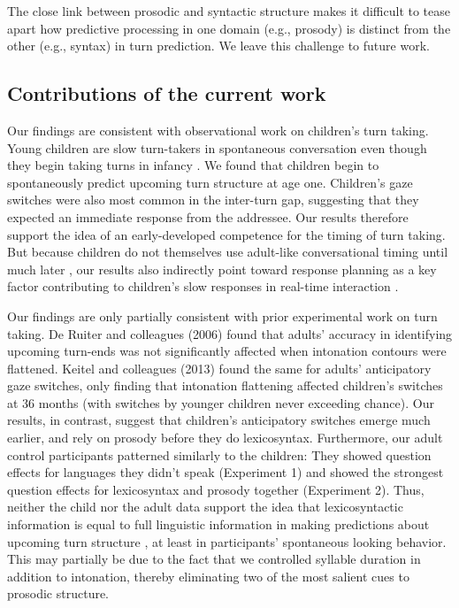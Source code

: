 \documentclass[authoryear, 12pt]{elsarticle}
\begin{document}
The close link between prosodic and syntactic structure makes it difficult to tease apart how predictive processing in one domain (e.g., prosody) is distinct from the other (e.g., syntax) in turn prediction. We leave this challenge to future work.

\subsection{Contributions of the current work}

Our findings are consistent with observational work on children's turn taking. Young children are slow turn-takers in spontaneous conversation \citep{casillas2015} even though they begin taking turns in infancy \citep{hilbrinkUR, jaffe2001}. We found that children begin to spontaneously predict upcoming turn structure at age one. Children's gaze switches were also most common in the inter-turn gap, suggesting that they expected an immediate response from the addressee. Our results therefore support the idea of an early-developed competence for the timing of turn taking. But because children do not themselves use adult-like conversational timing until much later \citep[age six; ][]{ervin-tripp1979}, our results also indirectly point toward response planning as a key factor contributing to children's slow responses in real-time interaction \citep{casillas2015}.

Our findings are only partially consistent with prior experimental work on turn taking. De Ruiter and colleagues (2006) found that adults' accuracy in identifying upcoming turn-ends was not significantly affected when intonation contours were flattened. Keitel and colleagues (2013) found the same for adults' anticipatory gaze switches, only finding that intonation flattening affected children's switches at 36 months (with switches by younger children never exceeding chance). Our results, in contrast, suggest that children's anticipatory switches emerge much earlier, and rely on prosody before they do lexicosyntax. Furthermore, our adult control participants patterned similarly to the children: They showed question effects for languages they didn't speak (Experiment 1) and showed the strongest question effects for lexicosyntax and prosody together (Experiment 2). Thus, neither the child nor the adult data support the idea that lexicosyntactic information is equal to full linguistic information in making predictions about upcoming turn structure \citep{de-ruiter2006}, at least in participants' spontaneous looking behavior. This may partially be due to the fact that we controlled syllable duration in addition to intonation, thereby eliminating two of the most salient cues to prosodic structure. 
\end{document}
